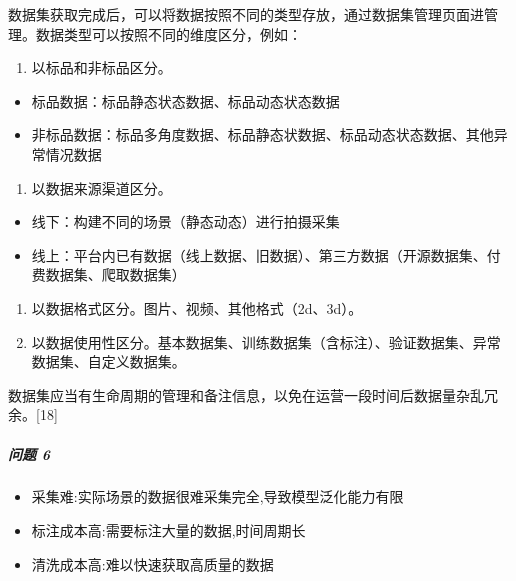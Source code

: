 \documentclass[letterpaper,10pt,english]{sphinxmanual}
\begin{document}
数据集获取完成后，可以将数据按照不同的类型存放，通过数据集管理页面进管理。数据类型可以按照不同的维度区分，例如：
\begin{enumerate}
%
\item {} 
以标品和非标品区分。

\end{enumerate}
\begin{itemize}
\item {} 
标品数据：标品静态状态数据、标品动态状态数据

\item {} 
非标品数据：标品多角度数据、标品静态状数据、标品动态状态数据、其他异常情况数据

\end{itemize}
\begin{enumerate}
%
\setcounter{enumi}{1}
\item {} 
以数据来源渠道区分。

\end{enumerate}
\begin{itemize}
\item {} 
线下：构建不同的场景（静态动态）进行拍摄采集

\item {} 
线上：平台内已有数据（线上数据、旧数据）、第三方数据（开源数据集、付费数据集、爬取数据集）

\end{itemize}
\begin{enumerate}
%
\setcounter{enumi}{2}
\item {} 
以数据格式区分。图片、视频、其他格式（2d、3d）。

\item {} 
以数据使用性区分。基本数据集、训练数据集（含标注）、验证数据集、异常数据集、自定义数据集。

\end{enumerate}

数据集应当有生命周期的管理和备注信息，以免在运营一段时间后数据量杂乱冗余。{[}18{]}


\subparagraph{问题 6\sphinxfootnotemark[380]}
\label{\detokenize{chapter_idea/data:id13}}%
\begin{footnotetext}[379]\sphinxAtStartFootnote
{}
%
\end{footnotetext}\ignorespaces %
\begin{footnotetext}[380]\sphinxAtStartFootnote
{}
%
\end{footnotetext}\ignorespaces \begin{itemize}
\item {} 
采集难:实际场景的数据很难采集完全,导致模型泛化能力有限

\item {} 
标注成本高:需要标注大量的数据,时间周期长

\item {} 
清洗成本高:难以快速获取高质量的数据

\end{itemize}
\end{document}
